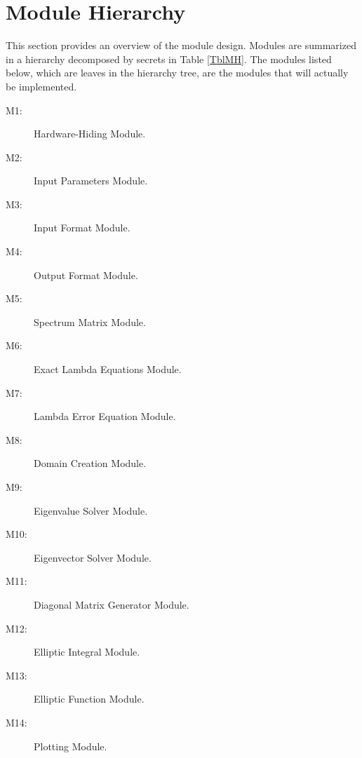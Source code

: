 \documentclass[12pt, titlepage]{article}
\begin{document}
\newpage 
\section{Module Hierarchy} \label{SecMH}

This section provides an overview of the module design. Modules are summarized
in a hierarchy decomposed by secrets in Table \ref{TblMH}. The modules listed
below, which are leaves in the hierarchy tree, are the modules that will
actually be implemented.

\begin{description}
\item[M1:] Hardware-Hiding Module.\\
\item[M2:] Input Parameters Module.\\
\item[M3:] Input Format Module.\\
\item[M4:] Output Format Module. \\
\item[M5:] Spectrum Matrix Module. \\
\item[M6:] Exact Lambda Equations Module.\\ 
\item[M7:] Lambda Error Equation Module. \\
\item[M8:] Domain Creation Module. \\
\item[M9:] Eigenvalue Solver Module. \\
\item[M10:] Eigenvector Solver Module. \\
\item[M11:] Diagonal Matrix Generator Module.\\ 
\item[M12:] Elliptic Integral Module. \\
\item[M13:] Elliptic Function Module. \\
\item[M14:] Plotting Module. \\
\end{description}
\end{document}
